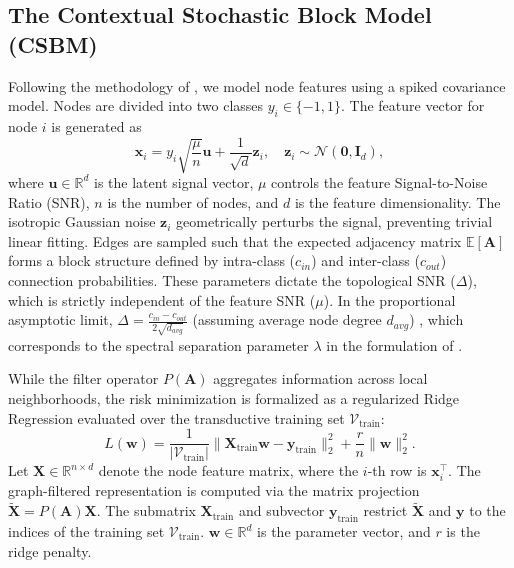 \documentclass[10pt]{article}
\begin{document}
\subsection{The Contextual Stochastic Block Model (CSBM)}

Following the methodology of \textcite{shi2024}, we model node features using a spiked covariance model.
Nodes are divided into two classes $y_i \in \{-1, 1\}$.
The feature vector for node $i$ is generated as
\begin{equation}
    \mathbf{x}_i = y_i \sqrt{\frac{\mu}{n}} \mathbf{u} + \frac{1}{\sqrt{d}} \mathbf{z}_i, \quad \mathbf{z}_i \sim \mathcal{N}(\mathbf{0}, \mathbf{I}_d),
\end{equation}
where $\mathbf{u} \in \mathbb{R}^d$ is the latent signal vector, $\mu$ controls the feature Signal-to-Noise Ratio (SNR), $n$ is the number of nodes, and $d$ is the feature dimensionality.
The isotropic Gaussian noise $\mathbf{z}_i$ geometrically perturbs the signal, preventing trivial linear fitting.
Edges are sampled such that the expected adjacency matrix $\mathbb{E}[\mathbf{A}]$ forms a block structure defined by intra-class ($c_{in}$) and inter-class ($c_{out}$) connection probabilities. These parameters dictate the topological SNR ($\Delta$), which is strictly independent of the feature SNR ($\mu$).
In the proportional asymptotic limit, $\Delta = \frac{c_{in} - c_{out}}{2\sqrt{d_{avg}}}$ (assuming average node degree $d_{avg}$) \parencite{benigni2020}, which corresponds to the spectral separation parameter $\lambda$ in the formulation of \textcite{shi2024}.

While the filter operator $P(\mathbf{A})$ aggregates information across local neighborhoods, the risk minimization is formalized as a regularized Ridge Regression evaluated over the transductive training set $\mathcal{V}_{\text{train}}$:
\begin{equation}
    L(\mathbf{w}) = \frac{1}{|\mathcal{V}_{\text{train}}|} \|\mathbf{X}_{\text{train}}\mathbf{w} - \mathbf{y}_{\text{train}}\|_2^2 + \frac{r}{n} \|\mathbf{w}\|_2^2.
\end{equation}
Let $\mathbf{X} \in \mathbb{R}^{n \times d}$ denote the node feature matrix, where the $i$-th row is $\mathbf{x}_i^\top$.
The graph-filtered representation is computed via the matrix projection $\tilde{\mathbf{X}} = P(\mathbf{A})\mathbf{X}$.
The submatrix $\mathbf{X}_{\text{train}}$ and subvector $\mathbf{y}_{\text{train}}$ restrict $\tilde{\mathbf{X}}$ and $\mathbf{y}$ to the indices of the training set $\mathcal{V}_{\text{train}}$.
$\mathbf{w} \in \mathbb{R}^d$ is the parameter vector, and $r$ is the ridge penalty.
\end{document}

